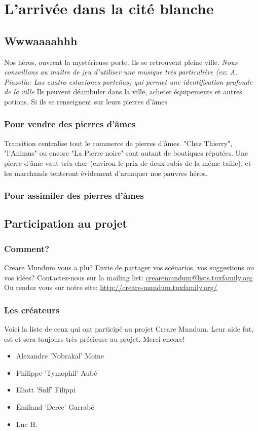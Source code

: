 \documentclass{book}
\begin{document}
\chapter{L'arrivée dans la cité blanche}
\section{Wwwaaaahhh}
Nos héros, ouvrent la mystérieuse porte. Ils se retrouvent pleine ville. \emph{Nous conseillons au maitre de jeu d'utiliser une musique très particulière (ex: A. Piazolla: Las cuatro estaciones porteñas) qui permet une identification profonde de la ville}
Ils peuvent déambuler dans la ville, acheter équipements et autres potions. Si ils se renseignent sur leurs pierres d'âmes
\subsection{Pour vendre des pierres d'âmes}
Transition centralise tout le commerce de pierres d'âmes. "Chez Thierry", "l'Animus" ou encore "La Pierre noire" sont autant de boutiques réputées. Une pierre d'âme vaut très cher (environ le prix de deux rubis de la même taille), et les marchands tenteront évidement d'arnaquer nos pauvres héros.
\subsection{Pour assimiler des pierres d'âmes}

\newpage
\section{Participation au projet}
\subsection{Comment?}
\hypertarget{participation}{}
Creare Mundum vous a plu? 
Envie de partager vos scénarios, vos suggestions ou vos idées?
\newline
Contactez-nous sur la mailing list: \href {mailto:crearemundum@lists.tuxfamily.org}{crearemundum@lists.tuxfamily.org}
\newline
Ou rendez vous sur notre site: \href {http://creare-mundum.tuxfamily.org/} {http://creare-mundum.tuxfamily.org/}
\subsection{Les créateurs}
Voici la liste de ceux qui ont participé au projet Creare Mundum. Leur aide fut, est et sera toujours très précieuse au projet. Merci encore!  
\begin{itemize}
\item Alexandre ’Nobrakal’ Moine 
\item Philippe ’Tymophil’ Aubé 
\item Eliott ’Sulf’ Filippi
\item Émiland ’Derec’ Garrabé
\item Luc H.
\end{itemize}
\end{document}
